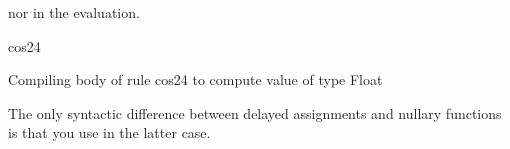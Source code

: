 \begin{xtc}
\begin{xtccomment}
nor in the evaluation.
\end{xtccomment}
\begin{spadsrc}
cos24 
\end{spadsrc}
\begin{MessageOutput}
   Compiling body of rule cos24 to compute value of type Float 
\end{MessageOutput}
\begin{TeXOutput}
\begin{fricasmath}{5}
%
\end{fricasmath}
\end{TeXOutput}
\end{xtc}
The only syntactic difference between delayed assignments
and nullary functions is that you use \spadSyntax{()} in the latter case.


